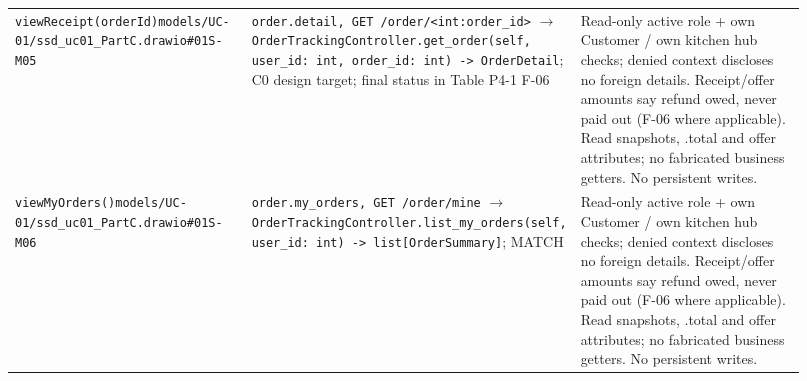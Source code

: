 \begin{longtable}{>{\raggedright\arraybackslash}p{0.3067\linewidth}>{\raggedright\arraybackslash}p{0.3067\linewidth}>{\raggedright\arraybackslash}p{0.3067\linewidth}}
\texttt{viewReceipt(orderId)}\newline{}\texttt{models/\allowbreak{}UC-01/\allowbreak{}ssd\_\allowbreak{}uc01\_\allowbreak{}PartC.\allowbreak{}drawio\#01S-M05} & \texttt{order.\allowbreak{}detail, GET /\allowbreak{}order/\allowbreak{}\textless{}int:order\_\allowbreak{}id\textgreater{}} \ensuremath{\rightarrow} \texttt{OrderTrackingController.\allowbreak{}get\_\allowbreak{}order(self, user\_\allowbreak{}id: int, order\_\allowbreak{}id: int) -\textgreater{} OrderDetail}; C0 design target; final status in Table P4-1 F-06 & Read-only active role + own Customer / own kitchen hub checks; denied context discloses no foreign details. Receipt/offer amounts say refund owed, never paid out (F-06 where applicable). Read snapshots, .total and offer attributes; no fabricated business getters. No persistent writes. \\
\texttt{viewMyOrders()}\newline{}\texttt{models/\allowbreak{}UC-01/\allowbreak{}ssd\_\allowbreak{}uc01\_\allowbreak{}PartC.\allowbreak{}drawio\#01S-M06} & \texttt{order.\allowbreak{}my\_\allowbreak{}orders, GET /\allowbreak{}order/\allowbreak{}mine} \ensuremath{\rightarrow} \texttt{OrderTrackingController.\allowbreak{}list\_\allowbreak{}my\_\allowbreak{}orders(self, user\_\allowbreak{}id: int) -\textgreater{} list[OrderSummary]}; MATCH & Read-only active role + own Customer / own kitchen hub checks; denied context discloses no foreign details. Receipt/offer amounts say refund owed, never paid out (F-06 where applicable). Read snapshots, .total and offer attributes; no fabricated business getters. No persistent writes. \\

\end{longtable}
